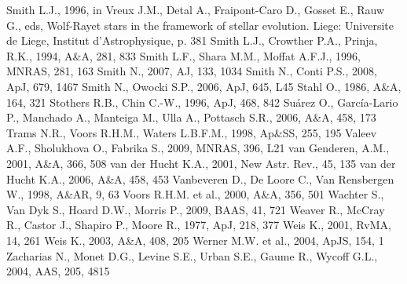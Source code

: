 \documentclass[useAMS]{mn2e}
\begin{document}
\begin{thebibliography}{}
\bibitem{} Smith L.J., 1996, in Vreux J.M., Detal A., Fraipont-Caro D., Gosset E., Rauw G., eds, Wolf-Rayet
stars in the framework of stellar evolution. Liege: Universite de
Liege, Institut d'Astrophysique, p. 381
\bibitem{} Smith L.J., Crowther P.A., Prinja, R.K., 1994, A\&A, 281, 833
\bibitem{} Smith L.F., Shara M.M., Moffat A.F.J., 1996, MNRAS, 281, 163
\bibitem{} Smith N., 2007, AJ, 133, 1034
\bibitem{} Smith N., Conti P.S., 2008, ApJ, 679, 1467
\bibitem{} Smith N., Owocki S.P., 2006, ApJ, 645, L45
\bibitem{} Stahl O., 1986, A\&A, 164, 321
\bibitem{} Stothers R.B., Chin C.-W., 1996, ApJ, 468, 842
\bibitem{} Su\'{a}rez O., Garc\'{i}a-Lario P., Manchado A., Manteiga M., Ulla A., Pottasch S.R., 2006, A\&A, 458, 173
\bibitem{} Trams N.R., Voors R.H.M., Waters L.B.F.M., 1998, Ap\&SS, 255, 195
\bibitem{} Valeev A.F., Sholukhova O., Fabrika S., 2009, MNRAS, 396, L21
\bibitem{} van Genderen, A.M., 2001, A\&A, 366, 508
\bibitem{} van der Hucht K.A., 2001, New Astr. Rev., 45, 135
\bibitem{} van der Hucht K.A., 2006, A\&A, 458, 453
\bibitem{} Vanbeveren D., De Loore C., Van Rensbergen W., 1998, A\&AR, 9, 63
\bibitem{} Voors R.H.M. et al., 2000, A\&A, 356, 501
\bibitem{} Wachter S., Van Dyk S., Hoard D.W., Morris P., 2009, BAAS, 41, 721
\bibitem{} Weaver R., McCray R., Castor J., Shapiro P., Moore R., 1977, ApJ, 218, 377
\bibitem{} Weis K., 2001, RvMA, 14, 261
\bibitem{} Weis K., 2003, A\&A, 408, 205
\bibitem{} Werner M.W. et al., 2004, ApJS, 154, 1
\bibitem{} Zacharias N., Monet D.G., Levine S.E., Urban S.E., Gaume R., Wycoff G.L., 2004, AAS, 205, 4815

\end{thebibliography}
\end{document}
